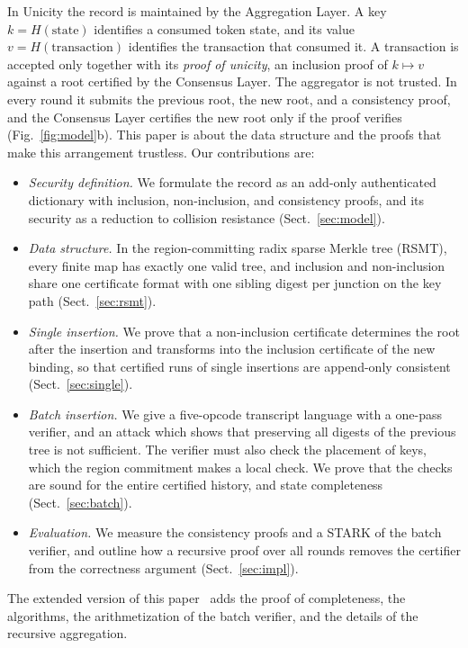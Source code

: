 \documentclass[runningheads]{llncs}
\begin{document}
In Unicity the record is maintained by the Aggregation Layer. A key $k = H(\text{state})$ identifies a consumed token state, and its value $v = H(\text{transaction})$ identifies the transaction that consumed it. A transaction is accepted only together with its \emph{proof of unicity}, an inclusion proof of $k \mapsto v$ against a root certified by the Consensus Layer. The aggregator is not trusted. In every round it submits the previous root, the new root, and a consistency proof, and the Consensus Layer certifies the new root only if the proof verifies (Fig.~\ref{fig:model}b). This paper is about the data structure and the proofs that make this arrangement trustless. Our contributions are:
\begin{itemize}
  \item \emph{Security definition.} We formulate the record as an add-only authenticated dictionary with inclusion, non-inclusion, and consistency proofs, and its security as a reduction to collision resistance (Sect.~\ref{sec:model}).
  \item \emph{Data structure.} In the region-committing radix sparse Merkle tree (RSMT), every finite map has exactly one valid tree, and inclusion and non-inclusion share one certificate format with one sibling digest per junction on the key path (Sect.~\ref{sec:rsmt}).
  \item \emph{Single insertion.} We prove that a non-inclusion certificate determines the root after the insertion and transforms into the inclusion certificate of the new binding, so that certified runs of single insertions are append-only consistent (Sect.~\ref{sec:single}).
  \item \emph{Batch insertion.} We give a five-opcode transcript language with a one-pass verifier, and an attack which shows that preserving all digests of the previous tree is not sufficient. The verifier must also check the placement of keys, which the region commitment makes a local check. We prove that the checks are sound for the entire certified history, and state completeness (Sect.~\ref{sec:batch}).
  \item \emph{Evaluation.} We measure the consistency proofs and a STARK of the batch verifier, and outline how a recursive proof over all rounds removes the certifier from the correctness argument (Sect.~\ref{sec:impl}).
\end{itemize}
The extended version of this paper~\cite{fullversion} adds the proof of completeness, the algorithms, the arithmetization of the batch verifier, and the details of the recursive aggregation.
\end{document}
